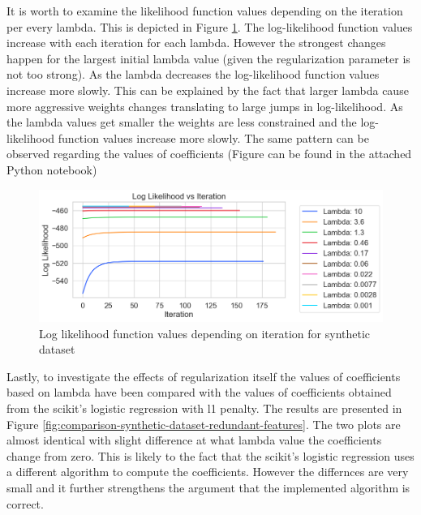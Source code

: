 \documentclass[12pt]{article}
\begin{document}
It is worth to examine the likelihood function values depending on the iteration per every lambda. This is depicted in Figure \ref{fig:log-likelihood-synthetic-dataset}. The log-likelihood function values increase with each iteration for each lambda. However the strongest changes happen for the largest initial lambda value (given the regularization parameter is not too strong). As the lambda decreases the log-likelihood function values increase more slowly. This can be explained by the fact that larger lambda cause more aggressive weights changes translating to large jumps in log-likelihood. As the lambda values get smaller the weights are less constrained and the log-likelihood function values increase more slowly. The same pattern can be observed regarding the values of coefficients (Figure can be found in the attached Python notebook) \par


\begin{figure}
    \centering
  \includegraphics[width=\textwidth]{../results/log_likelihood_synthetic_dataset.png}
    \caption{Log likelihood function values depending on iteration for synthetic dataset}
    \label{fig:log-likelihood-synthetic-dataset}
\end{figure}


Lastly, to investigate the effects of regularization itself the values of coefficients based on lambda have been compared with the values of coefficients obtained from the scikit's logistic regression with l1 penalty. The results are presented in Figure \ref{fig:comparison-synthetic-dataset-redundant-features}. The two plots are almost identical with slight difference at what lambda value the coefficients change from zero. This is likely to the fact that the scikit's logistic regression uses a different algorithm to compute the coefficients. However the differnces are very small and it further strengthens the argument that the implemented algorithm is correct. \par
\end{document}
